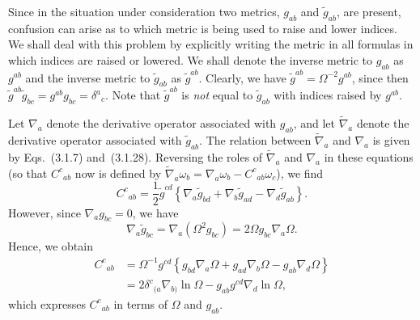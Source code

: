 Since in the situation under consideration two metrics, \(g_{ab}\) and
\(\widetilde g_{ab}\), are present, confusion can arise as to which metric is being
used to raise and lower indices. We shall deal with this problem by explicitly
writing the metric in all formulas in which indices are raised or lowered. We shall
denote the inverse metric to \(g_{ab}\) as \(g^{ab}\) and the inverse metric to
\(\widetilde g_{ab}\) as \(\widetilde g^{ab}\). Clearly, we have
\(\widetilde g^{ab}=\Omega^{-2}g^{ab}\), since then
\(\widetilde g^{ab}\widetilde g_{bc}=g^{ab}g_{bc}=\delta^a{}_c\). Note that
\(\widetilde g^{ab}\) is \emph{not} equal to \(\widetilde g_{ab}\) with indices
raised by \(g^{ab}\).

Let \(\nabla_a\) denote the derivative operator associated with \(g_{ab}\), and let
\(\widetilde\nabla_a\) denote the derivative operator associated with
\(\widetilde g_{ab}\). The relation between \(\widetilde\nabla_a\) and \(\nabla_a\)
is given by Eqs.~(3.1.7) and~(3.1.28). Reversing the roles of
\(\widetilde\nabla_a\) and \(\nabla_a\) in these equations (so that
\(C^c{}_{ab}\) now is defined by
\(\widetilde\nabla_a\omega_b=\nabla_a\omega_b-C^c{}_{ab}\omega_c\)), we find
\begin{equation}
  C^c{}_{ab}
  =\frac{1}{2}\widetilde g^{cd}
  \left\{\nabla_a\widetilde g_{bd}
  +\nabla_b\widetilde g_{ad}
  -\nabla_d\widetilde g_{ab}\right\}.
  \tag{D.1}\label{eq:D.1}
\end{equation}
However, since \(\nabla_ag_{bc}=0\), we have
\begin{equation}
  \nabla_a\widetilde g_{bc}
  =\nabla_a(\Omega^2g_{bc})
  =2\Omega g_{bc}\nabla_a\Omega.
  \tag{D.2}\label{eq:D.2}
\end{equation}
Hence, we obtain
\begin{equation}
\begin{aligned}
  C^c{}_{ab}
  &=\Omega^{-1}g^{cd}
  \left\{g_{bd}\nabla_a\Omega+g_{ad}\nabla_b\Omega-g_{ab}\nabla_d\Omega\right\}\\
  &=2\delta^c{}_{(a}\nabla_{b)}\ln\Omega
  -g_{ab}g^{cd}\nabla_d\ln\Omega,
\end{aligned}
  \tag{D.3}\label{eq:D.3}
\end{equation}
which expresses \(C^c{}_{ab}\) in terms of \(\Omega\) and \(g_{ab}\).

